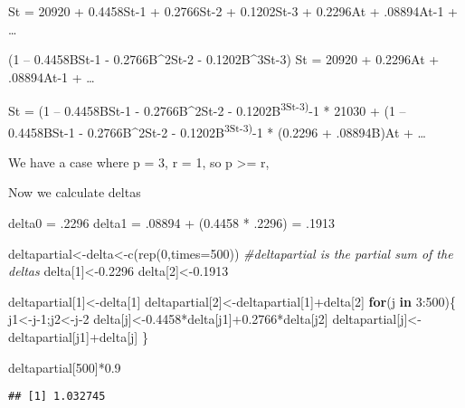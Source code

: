 \documentclass[
]{article}
\newenvironment{Shaded}{\begin{snugshade}}{\end{snugshade}}
\newcommand{\AttributeTok}[1]{\textcolor[rgb]{0.77,0.63,0.00}{#1}}
\newcommand{\CommentTok}[1]{\textcolor[rgb]{0.56,0.35,0.01}{\textit{#1}}}
\newcommand{\ControlFlowTok}[1]{\textcolor[rgb]{0.13,0.29,0.53}{\textbf{#1}}}
\newcommand{\DecValTok}[1]{\textcolor[rgb]{0.00,0.00,0.81}{#1}}
\newcommand{\FloatTok}[1]{\textcolor[rgb]{0.00,0.00,0.81}{#1}}
\newcommand{\FunctionTok}[1]{\textcolor[rgb]{0.00,0.00,0.00}{#1}}
\newcommand{\NormalTok}[1]{#1}
\newcommand{\OtherTok}[1]{\textcolor[rgb]{0.56,0.35,0.01}{#1}}
\newcommand{\SpecialCharTok}[1]{\textcolor[rgb]{0.00,0.00,0.00}{#1}}
\begin{document}
St = 20920 + 0.4458St-1 + 0.2766St-2 + 0.1202St-3 + 0.2296At +
.08894At-1 + \ldots{}

(1 -- 0.4458BSt-1 - 0.2766B\^{}2St-2 - 0.1202B\^{}3St-3) St = 20920 +
0.2296At + .08894At-1 + \ldots{}

St = (1 -- 0.4458BSt-1 - 0.2766B\^{}2St-2 -
0.1202B\textsuperscript{3St-3)}-1 * 21030 + (1 -- 0.4458BSt-1 -
0.2766B\^{}2St-2 - 0.1202B\textsuperscript{3St-3)}-1 * (0.2296 +
.08894B)At + \ldots{}

We have a case where p = 3, r = 1, so p \textgreater= r,

Now we calculate deltas

delta0 = .2296 delta1 = .08894 + (0.4458 * .2296) = .1913

\begin{Shaded}
\begin{Highlighting}[]
\NormalTok{deltapartial}\OtherTok{\textless{}{-}}\NormalTok{delta}\OtherTok{\textless{}{-}}\FunctionTok{c}\NormalTok{(}\FunctionTok{rep}\NormalTok{(}\DecValTok{0}\NormalTok{,}\AttributeTok{times=}\DecValTok{500}\NormalTok{))}
\CommentTok{\#deltapartial is the partial sum of the deltas}
\NormalTok{delta[}\DecValTok{1}\NormalTok{]}\OtherTok{\textless{}{-}}\FloatTok{0.2296}
\NormalTok{delta[}\DecValTok{2}\NormalTok{]}\OtherTok{\textless{}{-}}\FloatTok{0.1913}

\NormalTok{deltapartial[}\DecValTok{1}\NormalTok{]}\OtherTok{\textless{}{-}}\NormalTok{delta[}\DecValTok{1}\NormalTok{]}
\NormalTok{deltapartial[}\DecValTok{2}\NormalTok{]}\OtherTok{\textless{}{-}}\NormalTok{deltapartial[}\DecValTok{1}\NormalTok{]}\SpecialCharTok{+}\NormalTok{delta[}\DecValTok{2}\NormalTok{]}
\ControlFlowTok{for}\NormalTok{(j }\ControlFlowTok{in} \DecValTok{3}\SpecialCharTok{:}\DecValTok{500}\NormalTok{)\{}
\NormalTok{j1}\OtherTok{\textless{}{-}}\NormalTok{j}\DecValTok{{-}1}\NormalTok{;j2}\OtherTok{\textless{}{-}}\NormalTok{j}\DecValTok{{-}2}
\NormalTok{delta[j]}\OtherTok{\textless{}{-}}\FloatTok{0.4458}\SpecialCharTok{*}\NormalTok{delta[j1]}\SpecialCharTok{+}\FloatTok{0.2766}\SpecialCharTok{*}\NormalTok{delta[j2]}
\NormalTok{deltapartial[j]}\OtherTok{\textless{}{-}}\NormalTok{deltapartial[j1]}\SpecialCharTok{+}\NormalTok{delta[j]}
\NormalTok{\}}

\NormalTok{deltapartial[}\DecValTok{500}\NormalTok{]}\SpecialCharTok{*}\FloatTok{0.9}
\end{Highlighting}
\end{Shaded}

\begin{verbatim}
## [1] 1.032745
\end{verbatim}
\end{document}
